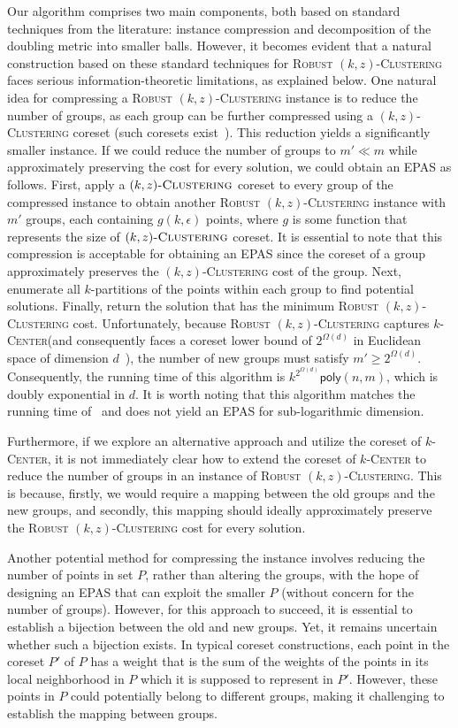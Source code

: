 \documentclass[11pt]{article}
\newcommand{\poly}{\ensuremath{\textsf{poly}}}
\newcommand{\kzc}{\textsc{$(k,z)$-Clustering}\xspace}
\newcommand{\kc}{\textsc{$k$-Center}\xspace}
\newcommand{\rkc}{\textsc{Robust $(k,z)$-Clustering}\xspace}
\begin{document}
Our algorithm comprises two main components, both based on standard techniques from the literature: instance compression and decomposition of the doubling metric into smaller balls. However, it becomes evident that a natural construction based on these standard techniques for \rkc  faces serious information-theoretic limitations, as explained below.
One natural idea for compressing a \rkc instance is to reduce the number of groups, as each group can be further compressed using a \kzc coreset (such coresets exist~\cite{cohen-addad-etal21:coreset-framework}). This reduction yields a significantly smaller instance. If we could reduce the number of groups to $m' \ll m$ while approximately preserving the cost for every solution, we could obtain an EPAS as follows.
First, apply a $\kzc$ coreset to every group of the compressed instance to obtain another \rkc instance with $m'$ groups, each containing $g(k,\epsilon)$ points, where $g$ is some function that represents the size of $\kzc$ coreset. It is essential to note that this compression is acceptable for obtaining an EPAS since the coreset of a group approximately preserves the \kzc cost of the group.
Next, enumerate all $k$-partitions of the points within each group to find potential solutions. Finally, return the solution that has the minimum \rkc cost. Unfortunately, because \rkc captures \kc (and consequently faces a coreset lower bound of $2^{\Omega(d)}$ in Euclidean space of dimension $d$~\cite{braverman2019coresets}), the number of new groups must satisfy $m' \ge 2^{\Omega(d)}$. Consequently, the running time of this algorithm is $k^{2^{\Omega(d)}}\poly(n,m)$, which is doubly exponential in $d$. It is worth noting that this algorithm matches the running time of~\cite{abbasi-etal23:epas-norm-clustering} and does not yield an EPAS for sub-logarithmic dimension.


Furthermore, if we explore an alternative approach and utilize the coreset of \kc, it is not immediately clear how to extend the coreset of \kc to reduce the number of groups in an instance of \rkc. This is because, firstly, we would require a mapping between the old groups and the new groups, and secondly, this mapping should ideally approximately preserve the \rkc cost for every solution.

Another potential method for compressing the instance involves reducing the number of points in set $P$, rather than altering the groups, with the hope of designing an EPAS that can exploit the smaller $P$ (without concern for the number of groups). However, for this approach to succeed, it is essential to establish a bijection between the old and new groups. Yet, it remains uncertain whether such a bijection exists. In typical coreset constructions, each point in the coreset $P'$ of $P$ has a weight that is the sum of the weights of the points in its local neighborhood in $P$ which it is supposed to represent in $P'$. However, these points in $P$ could potentially belong to different groups, making it challenging to establish the mapping between groups.
\end{document}
